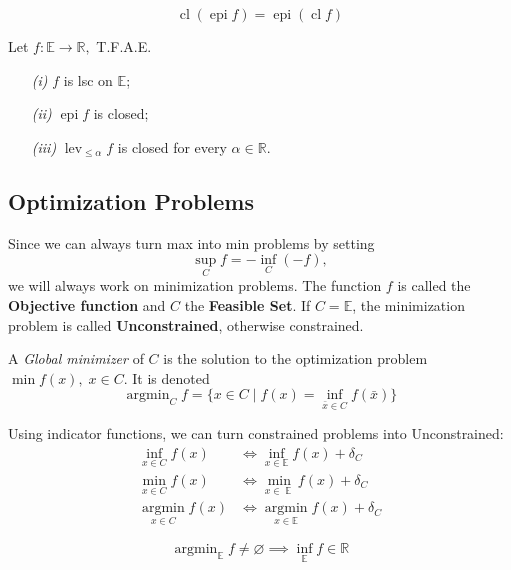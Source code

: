 \documentclass{tufte-handout}
\DeclareMathOperator{\cl}{cl}
\DeclareMathOperator{\epi}{epi}
\DeclareMathOperator{\lev}{lev}
\DeclareMathOperator{\argmin}{argmin}
\DeclareMathOperator{\E}{\mathbb{E}}
\begin{document}
{\begin{definition}
\end{definition}
\begin{remark} 
  $$\cl(\epi f) = \epi (\cl f) $$
\end{remark}
\begin{proposition} \label{label}
 Let $f : \mathbb{E} \to \mathbb{R},$ T.F.A.E.
  \begin{enumerate}
    \item[\it (i)] $f$ is lsc on $\mathbb{E}$;
    \item[\it (ii)] $\epi f$ is closed;
    \item[\it (iii)] $\lev_{\leq \alpha} f$ is closed for every $\alpha \in \mathbb{R}$.  
\end{enumerate}
\end{proposition}
\subsection{Optimization Problems}%
  \label{sub:Optimization Problems}
  Since we can always turn max into min problems by setting $$\sup_C f = - \inf_C (-f),$$ we will always work on minimization problems. The function $f$ is called the \textbf{Objective function} and $C$ the \textbf{Feasible Set}. If $C = \mathbb{E}$, the minimization problem is called \textbf{Unconstrained}, otherwise constrained. 
\begin{definition}
 A \textit{Global minimizer} of $C$ is the solution to the optimization problem $\min f(x), \; x \in C.$ It is denoted 
 $$\argmin_C f = \{ x \in C \mid f(x) = \inf_{\bar x \in C} f(\bar x) \} $$
\end{definition}
\begin{remark} 
  Using indicator functions, we can turn constrained problems into Unconstrained: 
  \begin{equation*}
    \begin{split}
      \inf_{x\in C} f(x) &\iff \inf_{x \in \mathbb{E}}f(x)+ \delta_C\\ 
       \min_{x \in C} f(x) &\iff \min_{x \in \E} f(x) + \delta_C \\ 
        \underset{x \in C}{\argmin}f(x) &\iff \underset{x \in \mathbb{E}}{\argmin} f(x)+ \delta_C 
    \end{split}
  \end{equation*}
  
\end{remark}
\begin{proposition} \label{label}
  $$\argmin_{\mathbb{E}} f \neq \varnothing \implies \inf_{\mathbb{E}} f\in \mathbb{R} $$
\end{proposition}

}
\end{document}
